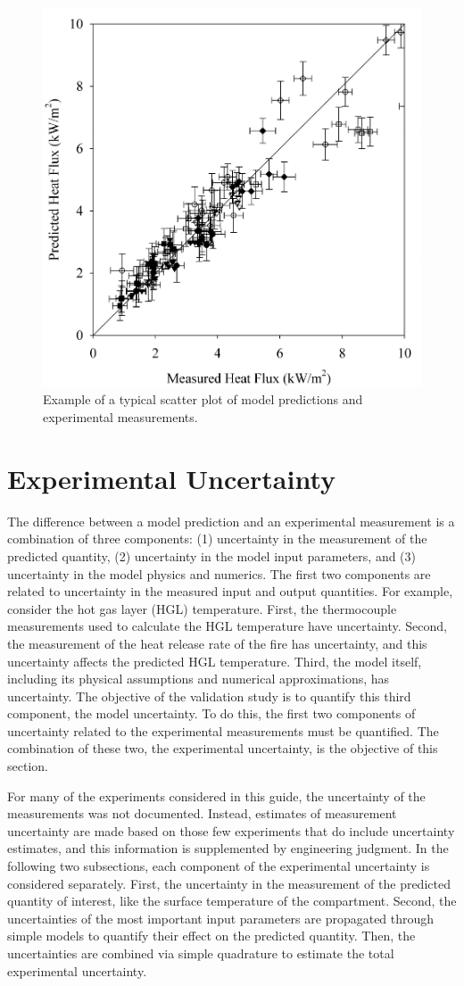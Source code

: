 \begin{figure}[ht]
\begin{center}
\includegraphics[height=3.in]{FIGURES/scatterplot}
\end{center}
\caption[Sample scatter plot.]{Example of a typical scatter plot of model predictions and experimental measurements.}
\label{scatterplot}
\end{figure}


\section{Experimental Uncertainty}

The difference between a model prediction and an experimental measurement is a combination of three components: (1) uncertainty in the measurement of the predicted quantity, (2) uncertainty in the model input parameters, and (3) uncertainty in the model physics and numerics. The first two components are related to uncertainty in the measured input and output quantities. For example, consider the hot gas layer (HGL) temperature. First, the thermocouple measurements used to calculate the HGL temperature have uncertainty. Second, the measurement of the heat release rate of the fire has uncertainty, and this uncertainty affects the predicted HGL temperature. Third, the model itself, including its physical assumptions and numerical approximations, has uncertainty. The objective of the validation study is to quantify this third component, the model uncertainty. To do this, the first two components of uncertainty related to the experimental measurements must be quantified. The combination of these two, the experimental uncertainty, is the objective of this section.

For many of the experiments considered in this guide, the uncertainty of the measurements was not documented. Instead, estimates of measurement uncertainty are made based on those few experiments that do include uncertainty estimates, and this information is supplemented by engineering judgment. In the following two subsections, each component of the experimental uncertainty is considered separately. First, the uncertainty in the measurement of the predicted quantity of interest, like the surface temperature of the compartment. Second, the uncertainties of the most important input parameters are propagated through simple models to quantify their effect on the predicted quantity. Then, the uncertainties are combined via simple quadrature to estimate the total experimental uncertainty.


